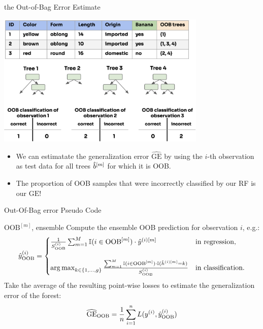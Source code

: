 \documentclass[11pt,compress,t,notes=noshow,xcolor=table]{beamer}
\begin{document}
\begin{vbframe}{the Out-of-Bag Error Estimate}
  
\begin{center}
  \includegraphics[width=0.75\textwidth]{figure_man/forest-oob-error.png}
\end{center}

\begin{itemize}
  \item We can estimatate the generalization error $\widehat{\mathrm{GE}}$ by using the $i$-th observation as test data for all trees $\hat{b}^{[m]}$ for which it is OOB. 
  \item The proportion of OOB samples that were incorrectly classified by our RF is our $\widehat{\mathrm{GE}}$!
\end{itemize}

\end{vbframe}

\begin{vbframe}{Out-Of-Bag error Pseudo Code}
\begin{algorithm}[H]
  \footnotesize
  \caption*{Out-Of-Bag error calculation}
  \begin{algorithmic}[1]
     $\text{OOB}^{[m]}$, ensemble
      \State Compute the ensemble OOB prediction for observation $i$, e.g.:
      $$\hat{y}^{(i)}_{\text{OOB}} = \begin{cases}
      \frac{1}{S_{\text{OOB}}^{(i)}} \sum_{m = 1}^{M} 
      \mathbb{I}(i \in \text{OOB}^{[m]}) \cdot \hat{y}^{(i)[m]} & \text{in regression,} 
      \\ \phantom{x} \\
      \operatorname*{arg\,max}_{k \in \{1, \ldots, g\}} 
      \frac{\sum_{m = 1}^{M} \mathbb{I}(i \in \text{OOB}^{[m]}) \cdot 
      \mathbb{I}(\hat{h}^{(i)[m]} = k)} {S_{\text{OOB}}^{(i)}} &
      \text{in classification.}
      \end{cases}$$
    \EndFor
    \State Take the average of the resulting point-wise losses to estimate the generalization error of the forest: $$\widehat{\mathrm{GE}}_{\text{OOB}} = \frac{1}{n} \sum\limits_{i=1}^n L(y^{(i)}, \hat{y}^{(i)}_{\text{OOB}})$$
  
  \end{algorithmic}
\end{algorithm}
\end{vbframe}
\end{document}
